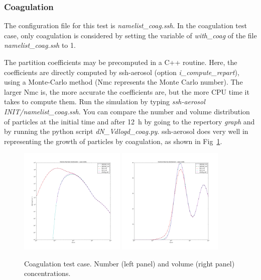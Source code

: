 \documentclass[a4paper,11pt]{article}
\begin{document}
\subsubsection{Coagulation}
\label{coag-test}

The configuration file for this test is {\it{namelist\_coag.ssh}}.
In the coagulation test case, only coagulation is considered by setting the variable of {\it{with\_coag}} of the file {\it{namelist\_coag.ssh}} to 1.

The partition coefficients may be precomputed in a C++ routine. Here, the
coefficients are directly computed by ssh-aerosol (option {\it{i\_compute\_repart}}), using a
Monte-Carlo method (Nmc represents the Monte Carlo number). The larger Nmc is,
the more accurate the coefficients are, but the more CPU time it takes to
compute them.
Run the simulation by typing {\it{ssh-aerosol INIT/namelist\_coag.ssh}}.
You can compare the number and volume distribution of particles at the initial
time and after 12~h by going to the repertory {\it{graph}} and by running the
python script {\it{dN\_Vdlogd\_coag.py}}.
ssh-aerosol does very well in representing the growth of particles by
coagulation, as shown in Fig~\ref{fig-coag}.

\begin{figure}[H]
        \begin{center}
                \includegraphics[angle=0,width=0.45\textwidth]{../graph/figure_ref/dNdlogd_COAG.png}
                \includegraphics[angle=0,width=0.45\textwidth]{../graph/figure_ref/dVdlogd_COAG.png}
        \end{center}
\caption{Coagulation test case. Number (left panel) and volume (right panel) concentrations.}
\label{fig-coag}
\end{figure}
        
\end{document}
